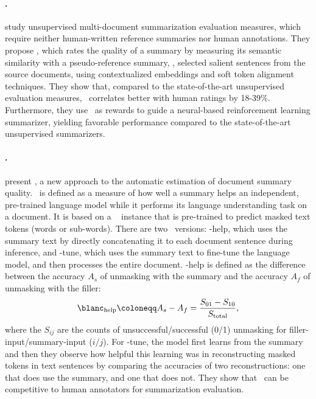 \paragraph{\supert.}
\citet{gao2020supert} study unsupervised multi-document summarization evaluation measures, which require neither human-written reference summaries nor human annotations. They propose \supert, which rates the quality of a summary by measuring its semantic similarity with a pseudo-reference summary, \ie, selected salient sentences from the source documents, using contextualized embeddings and soft token alignment techniques. They show that, compared to the state-of-the-art unsupervised evaluation measures, \supert\ correlates better with human ratings by 18-39\%. Furthermore, they use \supert\ as rewards to guide a neural-based reinforcement learning summarizer, yielding favorable performance compared to the state-of-the-art unsupervised summarizers.

\paragraph{\blanc.}
\citet{vasilyev2020fill} present \blanc, a new approach to the automatic estimation of document summary quality. \blanc\ is defined as a measure of how well a summary helps an independent, pre-trained language model while it performs its language understanding task on a document. It is based on a \bert\ \citep{devlin-etal-2019-bert} instance that is pre-trained to predict masked text tokens (words or sub-words). There are two \blanc\ versions: \blanc-help, which uses the summary text by directly concatenating it to each document sentence during inference, and \blanc-tune, which uses the summary text to fine-tune the language model, and then processes the entire document. \blanc-help is defined as the difference between the accuracy $A_s$ of unmasking with the summary and the accuracy $A_f$ of unmasking with the filler:
\[ \blanc_\textrm{help} \coloneqq A_s - A_f = \frac{S_{01} - S_{10}}{S_\mathrm{total}} , \]
where the $S_{ij}$ are the counts of unsuccessful/successful (0/1) unmasking for filler-input/summary-input ($i/j$). For \blanc-tune, the model first learns from the summary and then they observe how helpful this learning was in reconstructing masked tokens in text sentences by comparing the accuracies of two reconstructions: one that does use the summary, and one that does not. They show that \blanc\ can be competitive to human annotators for summarization evaluation.

